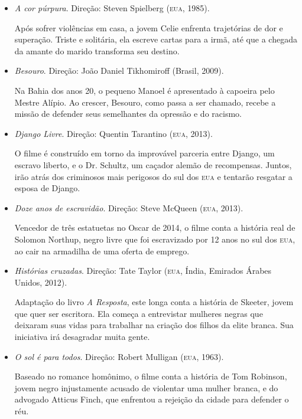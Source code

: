 \documentclass[11pt]{extarticle}
\begin{document}
\begin{itemize}
\item\emph{A cor púrpura}. Direção: Steven Spielberg (\textsc{eua}, 1985).

Após sofrer violências em casa, a jovem Celie enfrenta trajetórias de
dor e superação. Triste e solitária, ela escreve cartas para a irmã, até
que a chegada da amante do marido transforma seu destino.

\item\emph{Besouro}. Direção: João Daniel Tikhomiroff (Brasil, 2009).

Na Bahia dos anos 20, o pequeno Manoel é apresentado à capoeira pelo
Mestre Alípio. Ao crescer, Besouro, como passa a ser chamado, recebe a
missão de defender seus semelhantes da opressão e do racismo.

\item\emph{Django Livre}. Direção: Quentin Tarantino (\textsc{eua}, 2013).

O filme é construído em torno da improvável parceria entre Django, um
escravo liberto, e o Dr. Schultz, um caçador alemão de recompensas.
Juntos, irão atrás dos criminosos mais perigosos do sul dos \textsc{eua} e
tentarão resgatar a esposa de Django.

\item\emph{Doze anos de escravidão}. Direção: Steve McQueen (\textsc{eua}, 2013).

Vencedor de três estatuetas no Oscar de 2014, o filme conta a história
real de Solomon Northup, negro livre que foi escravizado por 12 anos no
sul dos \textsc{eua}, ao cair na armadilha de uma oferta de emprego.

\item\emph{Histórias cruzadas}. Direção: Tate Taylor (\textsc{eua}, Índia,
  Emirados Árabes Unidos, 2012).

Adaptação do livro \emph{A Resposta}, este longa conta a história de
Skeeter, jovem que quer ser escritora. Ela começa a entrevistar mulheres
negras que deixaram suas vidas para trabalhar na criação dos filhos da
elite branca. Sua iniciativa irá desagradar muita gente.

\item\emph{O sol é para todos}. Direção: Robert Mulligan (\textsc{eua}, 1963).

Baseado no romance homônimo, o filme conta a história de Tom Robinson,
jovem negro injustamente acusado de violentar uma mulher branca, e do
advogado Atticus Finch, que enfrentou a rejeição da cidade para defender
o réu.
\end{itemize}
\end{document}

